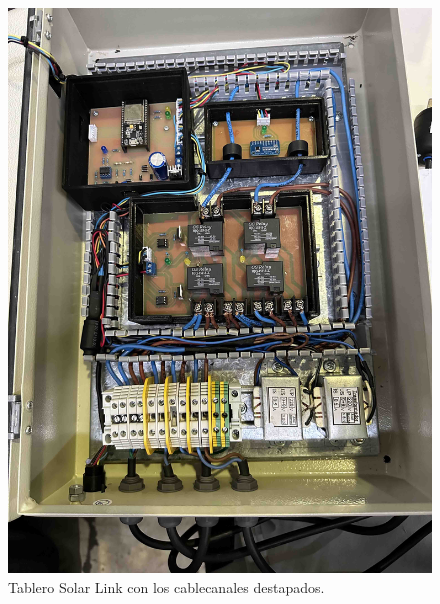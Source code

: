 \begin{figure}[H]
    \centering
    \includegraphics[width=1\linewidth]{hardware/IMG_9352.jpg}
    \caption{Tablero Solar Link con los cablecanales destapados.}
    \label{fig:enter-label}
\end{figure}

